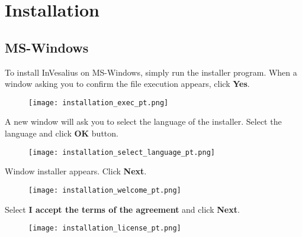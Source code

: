 \chapter{Installation}

\section{MS-Windows}


To install InVesalius on MS-Windows, simply run the installer program. When a window asking you to confirm the file execution appears, click \textbf{Yes}.

\begin{figure}[!htb]
\centering
\texttt{[image: installation\_exec\_pt.png]}
\end{figure}

\newpage
A new window will ask you to select the language of the installer. Select the language and click \textbf{OK} button.

\begin{figure}[!htb]
\centering
\texttt{[image: installation\_select\_language\_pt.png]}
\end{figure}
 
\hspace{.2cm}

Window installer appears. Click \textbf{Next}.


\begin{figure}[!htb]
\centering
\texttt{[image: installation\_welcome\_pt.png]}
\end{figure}

\newpage

Select \textbf{I accept the terms of the agreement} and click \textbf{Next}.

\begin{figure}[!htb] 
\centering
\texttt{[image: installation\_license\_pt.png]}
\end{figure}


